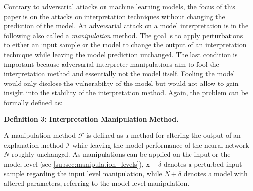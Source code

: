 Contrary to adversarial attacks on machine learning models, the focus of this paper is on the attacks on interpretation techniques without changing the prediction of the model. 
An adversarial attack on a model interpretation is in the following also called a \textit{manipulation} method. 
The goal is to apply perturbations to either an input sample or the model to change the output of an interpretation technique while leaving the model prediction unchanged. The last condition is important because adversarial interpreter manipulations aim to fool the interpretation method and essentially not the model itself. 
Fooling the model would only disclose the vulnerability of the model but would not allow to gain insight into the stability of the interpretation method. 
Again, the problem can be formally defined as:

\par\smallskip
\textbf{Definition 3: Interpretation Manipulation Method.}

\setlength{\leftskip}{0.39cm}
\noindent A manipulation method $\mathcal{F}$ is defined as a method for altering the output of an explanation method $\mathcal{I}$ while leaving the model performance of the neural network $N$ roughly unchanged. 
As manipulations can be applied on the input or the model level (see \autoref{subsec:manipulation_levels}), $\mathbf{x}+\delta$ denotes a perturbed input sample regarding the input level manipulation, while $N+\delta$ denotes a model with altered parameters, referring to the model level manipulation.

